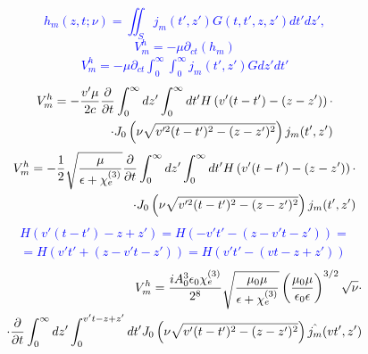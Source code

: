 \textcolor{blue}{ \begin{equation*} 
h_m (z, t; \nu) = \iint_S j_m (t',z') G(t,t',z,z') dt' dz',
\end{equation*} }
%
\textcolor{blue}{ \begin{equation*}
V_m^h = - \mu \partial_{ct} (h_m)
\end{equation*} }
%
\textcolor{blue} { \begin{equation*} \begin{aligned} 
V_m^h = - \mu \partial_{ct} \int_0^\infty \int_0^\infty j_m (t',z') G dz' dt'
\end{aligned} \end{equation*} }
%
\textcolor{blue} { \begin{equation*} \begin{aligned} 
V_m^h = - \frac{v' \mu}{2c}
\frac{\partial }{\partial t} \int_0^\infty dz' \int_0^\infty 
dt' H \left( v' (t-t') - (z-z') \right) \cdot \\
\cdot J_0 \left( \nu \sqrt{v'^2 (t-t')^2 - (z-z')^2} \right) j_m (t',z')
\end{aligned} \end{equation*} }
%
\textcolor{blue} { \begin{equation*} \begin{aligned} 
V_m^h = - \frac{1}{2} \sqrt{\frac{\mu}{\epsilon + \chi_e^{(3)}}}
\frac{\partial }{\partial t} \int_0^\infty dz' \int_0^\infty 
dt' H \left( v' (t-t') - (z-z') \right) \cdot \\
\cdot J_0 \left( \nu \sqrt{v'^2 (t-t')^2 - (z-z')^2} \right) j_m (t',z')
\end{aligned} \end{equation*} }
%
\textcolor{blue} { \begin{equation*} \begin{aligned} 
H \left( v' (t-t') - z + z' \right) = 
H \left( - v't' - ( z - v't - z' ) \right) = \\
= H \left( v't' + ( z - v't - z' ) \right) = 
H \left( v't' - ( vt - z + z' ) \right)
\end{aligned} \end{equation*} }
%
\begin{equation} \begin{aligned} 
V_m^h = \frac{i A_0^3 \epsilon_0 \chi_e^{(3)}}{2^8}
\sqrt{\frac{\mu_0 \mu}{\epsilon + \chi_e^{(3)}}} 
\left( \frac{\mu_0 \mu}{\epsilon_0 \epsilon} \right)^{3/2} \sqrt{\nu} 
\cdot \\ \cdot \frac{\partial }{\partial t} \int_0^\infty dz' \int_0^{v't - z + z'} dt'
J_0 \left( \nu \sqrt{v'(t-t')^2 - (z-z')^2} \right) \hat{j_m} (vt',z')
\end{aligned} \end{equation}

